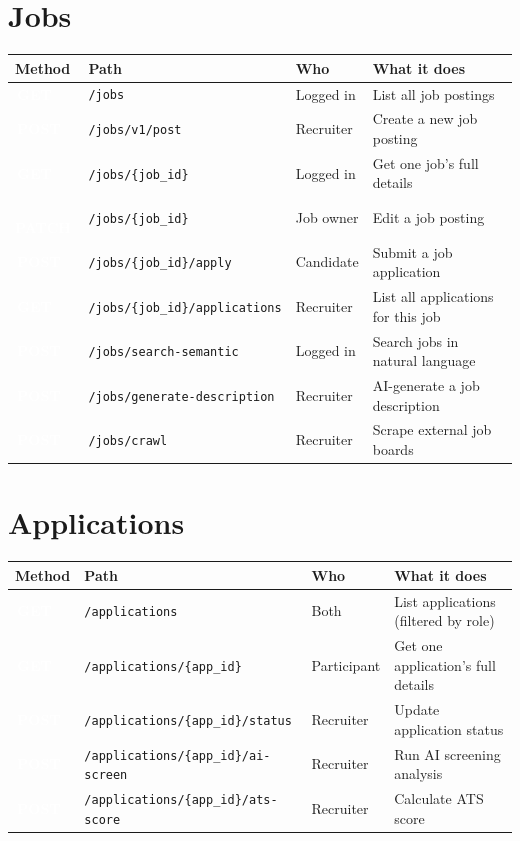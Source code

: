 \documentclass[12pt, a4paper]{report}
\newcommand{\code}[1]{\texttt{\small #1}}
\newcommand{\badge}[2]{%
  \colorbox{#1}{\textcolor{white}{\tiny\bfseries\,#2\,}}%
}
\newcommand{\GET}{\badge{successgr}{GET}}
\newcommand{\POST}{\badge{infoblue}{POST}}
\newcommand{\PATCH}{\badge{warnorange}{PATCH}}
\begin{document}
{%
\section{Jobs}

\begin{longtable}{p{1.5cm}p{5.5cm}p{2.2cm}p{5.5cm}}
\toprule
\textbf{Method} & \textbf{Path} & \textbf{Who} & \textbf{What it does} \\
\midrule
\endhead
\GET   & \code{/jobs}                          & Logged in  & List all job postings \\
\POST  & \code{/jobs/v1/post}                  & Recruiter  & Create a new job posting \\
\GET   & \code{/jobs/\{job\_id\}}              & Logged in  & Get one job's full details \\
\PATCH & \code{/jobs/\{job\_id\}}              & Job owner  & Edit a job posting \\
\POST  & \code{/jobs/\{job\_id\}/apply}        & Candidate  & Submit a job application \\
\GET   & \code{/jobs/\{job\_id\}/applications} & Recruiter  & List all applications for this job \\
\POST  & \code{/jobs/search-semantic}           & Logged in  & Search jobs in natural language \\
\POST  & \code{/jobs/generate-description}      & Recruiter  & AI-generate a job description \\
\POST  & \code{/jobs/crawl}                    & Recruiter  & Scrape external job boards \\
\bottomrule
\end{longtable}

\section{Applications}

\begin{longtable}{p{1.5cm}p{5.5cm}p{2.2cm}p{5.5cm}}
\toprule
\textbf{Method} & \textbf{Path} & \textbf{Who} & \textbf{What it does} \\
\midrule
\endhead
\GET  & \code{/applications}                      & Both       & List applications (filtered by role) \\
\GET  & \code{/applications/\{app\_id\}}          & Participant& Get one application's full details \\
\POST & \code{/applications/\{app\_id\}/status}   & Recruiter  & Update application status \\
\POST & \code{/applications/\{app\_id\}/ai-screen}& Recruiter  & Run AI screening analysis \\
\POST & \code{/applications/\{app\_id\}/ats-score}& Recruiter  & Calculate ATS score \\
\bottomrule
\end{longtable}

}
\end{document}

